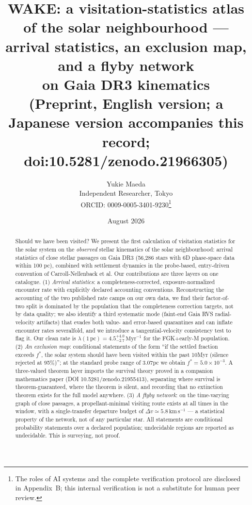 \documentclass[11pt]{article}
\title{WAKE: a visitation-statistics atlas of the solar neighbourhood ---\\
arrival statistics, an exclusion map, and a flyby network\\
on Gaia DR3 kinematics\\[1ex]
\large (Preprint, English version; a Japanese version accompanies this record; doi:10.5281/zenodo.21966305)}
\author{Yukie Maeda\\
\normalsize Independent Researcher, Tokyo\\
\normalsize ORCID: 0009-0005-3401-9230\thanks{The roles of AI systems and
the complete verification protocol are disclosed in Appendix~B; this internal
verification is not a substitute for human peer review.}}
\date{August 2026}
\newcommand{\Myr}{\,\mathrm{Myr}}
\newcommand{\pc}{\,\mathrm{pc}}
\newcommand{\kms}{\,\mathrm{km\,s^{-1}}}
\newcommand{\lam}{\lambda}
\begin{document}
\maketitle

\begin{abstract}
\noindent Should we have been visited? We present the first calculation of
visitation statistics for the solar system on the \emph{observed} stellar
kinematics of the solar neighbourhood: arrival statistics of close stellar
passages on Gaia DR3 (56{,}286 stars with 6D phase-space data within 100 pc),
combined with settlement dynamics in the probe-based, entry-driven convention
of Carroll-Nellenback et al. Our contributions are three layers on one
catalogue. (1) \emph{Arrival statistics}: a completeness-corrected,
exposure-normalized encounter rate with explicitly declared accounting
conventions. Reconstructing the accounting of the two published rate camps
on our own data, we find their factor-of-two split is dominated by the
population that the completeness correction targets, not by data quality; we
also identify a third systematic mode (faint-end Gaia RVS radial-velocity
artifacts) that evades both value- and error-based quarantines and can
inflate encounter rates severalfold, and we introduce a tangential-velocity
consistency test to flag it. Our clean rate is
$\lam(1\pc)=4.5^{+4.0}_{-2.7}\Myr^{-1}$ for the FGK+early-M population.
(2) \emph{An exclusion map}: conditional statements of the form ``if the
settled fraction exceeds $f^*$, the solar system should have been visited
within the past 10\;Myr (silence rejected at 95\%)''; at the standard probe
range of 3.07\;pc we obtain $f^*=5.0\times10^{-3}$. A three-valued theorem
layer imports the survival theory proved in a companion mathematics paper
(DOI 10.5281/zenodo.21955413), separating where survival is
theorem-guaranteed, where the theorem is silent, and recording that no
extinction theorem exists for the full model anywhere. (3) \emph{A flyby
network}: on the time-varying graph of close passages, a propellant-minimal
visiting route exists at all times in the window, with a single-transfer
departure budget of $\Delta v\simeq5.8\kms$ --- a statistical property of the
network, not of any particular star. All statements are conditional
probability statements over a declared population; undecidable regions are
reported as undecidable. This is surveying, not proof.
\end{abstract}

\tableofcontents

\end{document}
